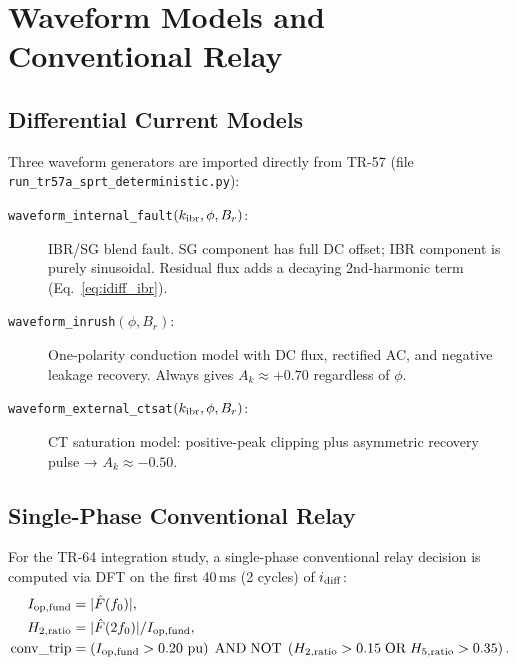 \documentclass[11pt, a4paper]{article}
\newcommand{\pu}{\,\text{pu}}
\newcommand{\Ak}{A_k}
\begin{document}
\section{Waveform Models and Conventional Relay}
\label{sec:waveforms}

\subsection{Differential Current Models}

Three waveform generators are imported directly from TR-57
\cite{SAMBP_TR57} (file \texttt{run\_tr57a\_sprt\_deterministic.py}):

\begin{description}
  \item[\texttt{waveform\_internal\_fault}$(k_{\rm ibr}, \phi, B_r)$:]
    IBR/SG blend fault.  SG component has full DC offset; IBR component is
    purely sinusoidal.  Residual flux adds a decaying 2nd-harmonic term
    (Eq.~\ref{eq:idiff_ibr}).

  \item[\texttt{waveform\_inrush}$(\phi, B_r)$:]
    One-polarity conduction model with DC flux, rectified AC, and negative
    leakage recovery.  Always gives $\Ak \approx +0.70$ regardless of $\phi$.

  \item[\texttt{waveform\_external\_ctsat}$(k_{\rm ibr}, \phi, B_r)$:]
    CT saturation model: positive-peak clipping plus asymmetric recovery
    pulse → $\Ak \approx -0.50$.
\end{description}

\subsection{Single-Phase Conventional Relay}

For the TR-64 integration study, a single-phase conventional relay decision
is computed via DFT on the first 40\,ms (2 cycles) of $i_{\rm diff}$:
\begin{align}
  I_{\rm op,fund} &= |\hat{F}(f_0)|, \\
  H_{2,\rm ratio} &= |\hat{F}(2f_0)| / I_{\rm op,fund}, \\
  \text{conv\_trip} &= \left(I_{\rm op,fund} > 0.20\,\pu\right)
    \;\text{AND}\; \text{NOT}\;
    \left(H_{2,\rm ratio} > 0.15\;\text{OR}\; H_{5,\rm ratio} > 0.35\right).
\end{align}
\end{document}
